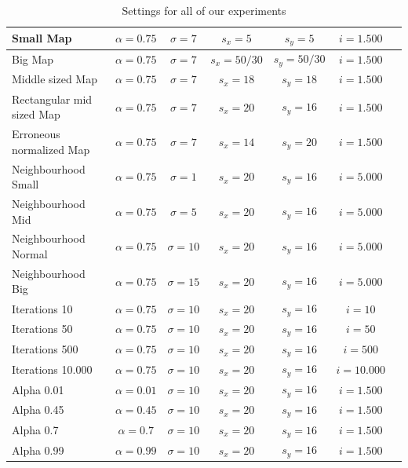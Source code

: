 \documentclass{acm_proc_article-sp}
\begin{document}
\begin{table}
\centering
\begin{tabular}{|l|c|c|c|c|c|c|}
    \hline
    Small Map & $\alpha = 0.75$ & $\sigma = 7$ & $s_x=5$ & $s_y=5$ & $i=1.500$ \\
    \hline
    Big Map & $\alpha = 0.75$ & $\sigma = 7$ & $s_x=50/30$ & $s_y=50/30$ & $i=1.500$ \\
    \hline
    Middle sized Map & $\alpha = 0.75$ & $\sigma = 7$ & $s_x=18$ & $s_y=18$ & $i=1.500$ \\
    \hline
    Rectangular mid sized Map & $\alpha = 0.75$ & $\sigma = 7$ & $s_x=20$ & $s_y=16$ & $i=1.500$ \\
    \hline
    Erroneous normalized Map & $\alpha = 0.75$ & $\sigma = 7$ & $s_x=14$ & $s_y=20$ & $i=1.500$ \\
    \hline
    Neighbourhood Small & $\alpha = 0.75$ & $\sigma = 1$ & $s_x=20$ & $s_y=16$ & $i=5.000$ \\
    \hline
    Neighbourhood Mid & $\alpha = 0.75$ & $\sigma = 5$ & $s_x=20$ & $s_y=16$ & $i=5.000$ \\
    \hline
    Neighbourhood Normal & $\alpha = 0.75$ & $\sigma = 10$ & $s_x=20$ & $s_y=16$ & $i=5.000$ \\
    \hline
    Neighbourhood Big & $\alpha = 0.75$ & $\sigma = 15$ & $s_x=20$ & $s_y=16$ & $i=5.000$ \\
    \hline
    Iterations 10 & $\alpha = 0.75$ & $\sigma = 10$ & $s_x=20$ & $s_y=16$ & $i=10$ \\
    \hline
    Iterations 50 & $\alpha = 0.75$ & $\sigma = 10$ & $s_x=20$ & $s_y=16$ & $i=50$ \\
    \hline
    Iterations 500 & $\alpha = 0.75$ & $\sigma = 10$ & $s_x=20$ & $s_y=16$ & $i=500$ \\
    \hline
    Iterations 10.000 & $\alpha = 0.75$ & $\sigma = 10$ & $s_x=20$ & $s_y=16$ & $i=10.000$ \\
    \hline
    Alpha 0.01 & $\alpha = 0.01$ & $\sigma = 10$ & $s_x=20$ & $s_y=16$ & $i=1.500$ \\
    \hline
    Alpha 0.45 & $\alpha = 0.45$ & $\sigma = 10$ & $s_x=20$ & $s_y=16$ & $i=1.500$ \\
    \hline
    Alpha 0.7 & $\alpha = 0.7$ & $\sigma = 10$ & $s_x=20$ & $s_y=16$ & $i=1.500$ \\
    \hline
    Alpha 0.99 & $\alpha = 0.99$ & $\sigma = 10$ & $s_x=20$ & $s_y=16$ & $i=1.500$ \\
    \hline
\end{tabular}
\caption{Settings for all of our experiments}
\label{tab:settings}
\end{table}
\end{document}
